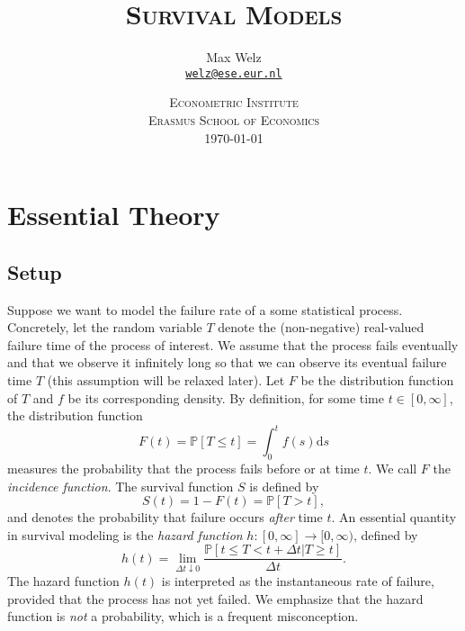 \documentclass[11pt]{article}
\title{\textsc{Survival Models}}
\author{Max Welz \\
  \href{mailto:welz@ese.eur.nl}{\texttt{welz@ese.eur.nl}}}
\date{%
    \textsc{Econometric Institute\\ Erasmus School of Economics}\\[2ex]%
    \today}
\renewcommand{\P}{\mathbb{P}}
\renewcommand{\d}{\text{d}}
\begin{document}
\maketitle

\section{Essential Theory}
\subsection{Setup}
Suppose we want to model the failure rate of a some statistical process. Concretely, let the random variable $T$ denote the (non-negative) real-valued failure time of the process of interest. We assume that the process fails eventually and that we observe it infinitely long so that we can observe its eventual failure time $T$ (this assumption will be relaxed later). Let $F$ be the distribution function of $T$ and $f$ be its corresponding density. By definition, for some time $t\in[0, \infty]$, the distribution function
\[
    F(t) = \P[T \leq t]
    =
    \int_0^t f(s)\d s
\]
measures the probability that the process fails before or at time $t$. We call $F$ the \textit{incidence function}. The survival function $S$ is defined by
\[
    S(t) = 1 - F(t) = \P[T > t],
\]
and denotes the probability that failure occurs \textit{after} time $t$. An essential quantity in survival modeling is the \textit{hazard function} $h:[0,\infty]\to[0,\infty)$, defined by
\begin{equation}\label{eq:hazard}
    h(t) = \lim_{\Delta t\downarrow 0}\frac{\P[t \leq T < t + \Delta t| T \geq t]}{\Delta t}.
\end{equation}
The hazard function $h(t)$ is interpreted as the instantaneous rate of failure, provided that the process has not yet failed. We emphasize that the hazard function is \textit{not} a probability, which is a frequent misconception.
\end{document}

